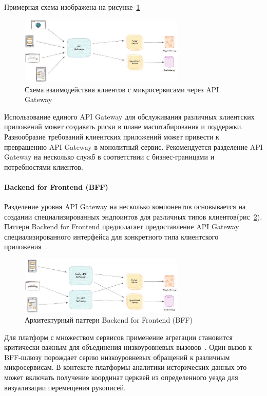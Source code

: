 Примерная схема изображена на рисунке~\ref{fig:api_gateway_interaction}
\begin{figure}[htbp]
    \centering
    \includegraphics[width=0.7\textwidth]{Dissertation/images/gateway_project_scheme}
    \caption{Схема взаимодействия клиентов с микросервисами через API Gateway}
    \label{fig:api_gateway_interaction}
\end{figure}

Использование единого API Gateway для обслуживания различных клиентских приложений может создавать риски в плане масштабирования и поддержки. Разнообразие требований клиентских приложений может привести к превращению API Gateway в монолитный сервис.
Рекомендуется разделение API Gateway на несколько служб в соответствии с бизнес-границами и потребностями клиентов.

\paragraph{Backend for Frontend (BFF)}

Разделение уровня API Gateway на несколько компонентов основывается на создании специализированных эндпоинтов для различных типов клиентов(рис~\ref{fig:bff_pattern}). Паттерн Backend for Frontend предполагает предоставление API Gateway специализированного интерфейса для конкретного типа клиентского приложения~\cite{alkhodary2023evaluation}.

\begin{figure}[htbp]
    \centering
    \includegraphics[width=0.7\textwidth]{Dissertation/images/bff}
    \caption{Архитектурный паттерн Backend for Frontend (BFF)}
    \label{fig:bff_pattern}
\end{figure}

Для платформ с множеством сервисов применение агрегации становится критически важным для объединения низкоуровневых вызовов~\cite{newman2015building}.
Один вызов к BFF-шлюзу порождает серию низкоуровневых обращений к различным микросервисам. В контексте платформы аналитики исторических данных это может включать получение координат церквей из определенного уезда для визуализации перемещения рукописей.

